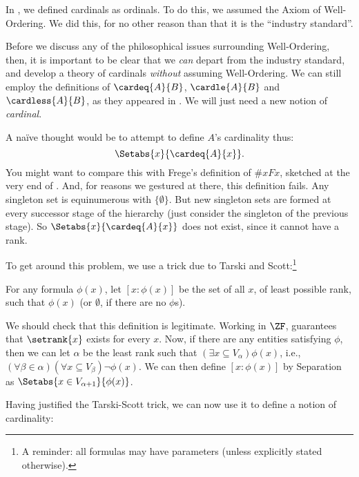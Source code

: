 \documentclass[../../../include/open-logic-section]{subfiles}
\begin{document}

In , we
defined cardinals as ordinals. To do this, we assumed the Axiom of
Well-Ordering. We did this, for no other reason than that it is the
``industry standard''.

Before we discuss any of the philosophical issues surrounding
Well-Ordering, then, it is important to be clear that we \emph{can}
depart from the industry standard, and develop a theory of cardinals
\emph{without} assuming Well-Ordering. We can still employ the
definitions of $\cardeq{A}{B}$, $\cardle{A}{B}$ and $\cardless{A}{B}$,
as they appeared in . We will just need a new
notion of \emph{cardinal}.

A na\"ive thought would be to attempt to define $A$'s cardinality thus:
\[
	\Setabs{x}{\cardeq{A}{x}}.
\]
You might want to compare this with Frege's definition of $\# x Fx$,
sketched at the very end of . And, for
reasons we gestured at there, this definition fails. Any singleton set
is equinumerous with $\{\emptyset\}$. But new singleton sets are
formed at every successor stage of the hierarchy (just consider the
singleton of the previous stage). So $\Setabs{x}{\cardeq{A}{x}}$ does
not exist, since it cannot have a rank.

To get around this problem, we use a trick due to Tarski and Scott:\footnote{A reminder: all formulas may have parameters (unless explicitly stated otherwise).}

\begin{defn}
For any formula $\phi(x)$, let
$[ x : \phi(x)] $ be the set of all $x$, of least possible rank, such
that $\phi(x)$ (or $\emptyset$, if there are no $\phi$s).
\end{defn}

We should check that this definition is legitimate. Working in $\ZF$,
 guarantees that
$\setrank{x}$ exists for every $x$. Now, if there are any entities
satisfying $\phi$, then we can let $\alpha$ be the least rank such
that  $(\exists x\subseteq V_\alpha)\phi(x)$, i.e., $(\forall \beta
\in \alpha)(\forall x \subseteq V_\beta)\lnot \phi(x)$. We can then
define $[x : \phi(x)]$ by Separation as $\Setabs{x \in
V_{\alpha+1}}{\phi(x)}$. 

Having justified the Tarski-Scott trick, we can now use it to define
a notion of cardinality:
\end{document}
